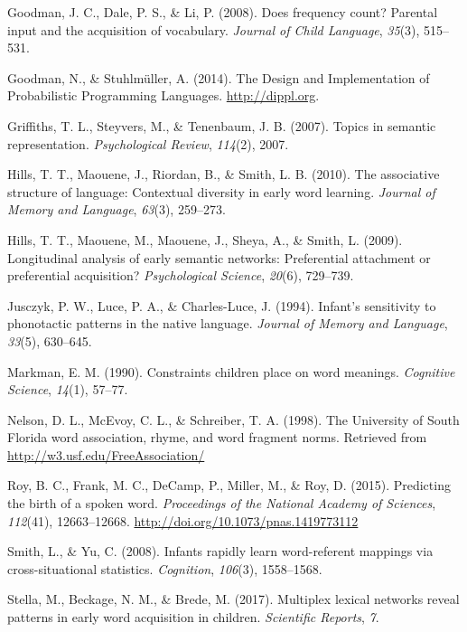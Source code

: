 \documentclass[10pt, letterpaper]{article}
\begin{document}
\hypertarget{ref-goodman2008}{}
Goodman, J. C., Dale, P. S., \& Li, P. (2008). Does frequency count?
Parental input and the acquisition of vocabulary. \emph{Journal of Child
Language}, \emph{35}(3), 515--531.

\hypertarget{ref-dippl}{}
Goodman, N., \& Stuhlmüller, A. (2014). The Design and Implementation of
Probabilistic Programming Languages. \url{http://dippl.org}.

\hypertarget{ref-griffiths07}{}
Griffiths, T. L., Steyvers, M., \& Tenenbaum, J. B. (2007). Topics in
semantic representation. \emph{Psychological Review}, \emph{114}(2),
2007.

\hypertarget{ref-hills2010}{}
Hills, T. T., Maouene, J., Riordan, B., \& Smith, L. B. (2010). The
associative structure of language: Contextual diversity in early word
learning. \emph{Journal of Memory and Language}, \emph{63}(3), 259--273.

\hypertarget{ref-hills2009}{}
Hills, T. T., Maouene, M., Maouene, J., Sheya, A., \& Smith, L. (2009).
Longitudinal analysis of early semantic networks: Preferential
attachment or preferential acquisition? \emph{Psychological Science},
\emph{20}(6), 729--739.

\hypertarget{ref-jusczyk1994}{}
Jusczyk, P. W., Luce, P. A., \& Charles-Luce, J. (1994). Infant's
sensitivity to phonotactic patterns in the native language.
\emph{Journal of Memory and Language}, \emph{33}(5), 630--645.

\hypertarget{ref-markman90}{}
Markman, E. M. (1990). Constraints children place on word meanings.
\emph{Cognitive Science}, \emph{14}(1), 57--77.

\hypertarget{ref-nelson1998}{}
Nelson, D. L., McEvoy, C. L., \& Schreiber, T. A. (1998). The University
of South Florida word association, rhyme, and word fragment norms.
Retrieved from \url{http://w3.usf.edu/FreeAssociation/}

\hypertarget{ref-roy2015}{}
Roy, B. C., Frank, M. C., DeCamp, P., Miller, M., \& Roy, D. (2015).
Predicting the birth of a spoken word. \emph{Proceedings of the National
Academy of Sciences}, \emph{112}(41), 12663--12668.
\url{http://doi.org/10.1073/pnas.1419773112}

\hypertarget{ref-smith2008}{}
Smith, L., \& Yu, C. (2008). Infants rapidly learn word-referent
mappings via cross-situational statistics. \emph{Cognition},
\emph{106}(3), 1558--1568.

\hypertarget{ref-stella2017}{}
Stella, M., Beckage, N. M., \& Brede, M. (2017). Multiplex lexical
networks reveal patterns in early word acquisition in children.
\emph{Scientific Reports}, \emph{7}.
\end{document}
